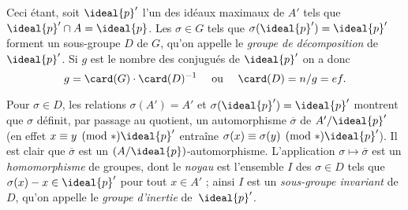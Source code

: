 \documentclass[11pt, %
  title in boldface,
  theorem in new line,
  theorem numbering = section,
  number theorems separately,
  simple name,
]{beaulivre}
\begin{document}
    Ceci étant, soit \( \ideal{p}' \) l'un des idéaux maximaux de \( A' \) tels que \( \ideal{p}' \cap A = \ideal{p} \). Les \( \sigma \in G \) tels que \( \sigma(\ideal{p}') = \ideal{p}' \) forment un sous-groupe \( D \) de \( G \), qu'on appelle le \emph{groupe de décomposition} de \( \ideal{p}' \). Si \( g \) est le nombre des conjugués de \( \ideal{p}' \) on a donc
    \begin{equation}\label{eq:card D = ef}
        g = \card(G) \cdot \card(D)^{-1}
        \quad \text{ ou } \quad
        \card(D) = n/g = ef.
    \end{equation}

    Pour \( \sigma \in D \), les relations \( \sigma(A') = A' \) et \( \sigma(\ideal{p}') = \ideal{p}' \) montrent que \( \sigma \) définit, par passage au quotient, un automorphisme \( \overline{\sigma} \) de \( A'/\ideal{p}' \) (en effet \( x \equiv y \pmod*{\ideal{p}'} \) entraîne \( \sigma(x) \equiv \sigma(y) \pmod*{\ideal{p}'} \)). Il est clair que \( \overline{\sigma} \) est un \( (A/\ideal{p}) \)‑automorphisme. L'application \( \sigma \mapsto \overline{\sigma} \) est un \emph{homomorphisme} de groupes, dont le \emph{noyau} est l'ensemble \( I \) des \( \sigma \in D \) tels que \( \sigma(x) - x \in \ideal{p}' \) pour tout \( x \in A' \) ; ainsi \( I \) est un \emph{sous-groupe invariant} de \( D \), qu'on appelle le \emph{groupe d'inertie} de~\( \ideal{p}' \).
\end{document}
